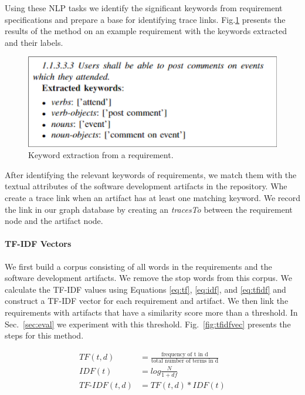   Using these NLP tasks we identify the significant keywords from requirement specifications and prepare a base for identifying trace links. Fig.\ref{fig:keywords} presents the results of the method on an example requirement with the keywords extracted and their labels.

  \begin{figure}[htb]
    \centering
    \includegraphics[width=.96\linewidth]{figs/keywords.png}
    \caption{Keyword extraction from a requirement.}
    \label{fig:keywords}
  \end{figure}

  After identifying the relevant keywords of requirements, we match them with the textual attributes of the software development artifacts in the repository. Whe create a trace link when an artifact has at least one matching keyword. We record the link in our graph database by creating an \emph{tracesTo} between the requirement node and the artifact node.

  \paragraph{TF-IDF Vectors} We first build a corpus consisting of all words in the requirements and the software development artifacts. We remove the stop words from this corpus. We calculate the TF-IDF values using Equations \ref{eq:tf}, \ref{eq:idf}, and \ref{eq:tfidf} and construct a TF-IDF vector for each requirement and artifact. We then link the requirements with artifacts that have a similarity score more than a threshold. In Sec.~\ref{sec:eval} we experiment with this threshold. Fig.~\ref{fig:tfidfvec} presents the steps for this method.

  \begin{align}
    TF(t,d) &= \frac{\text{frequency of t in d}}{\text{total number of terms in d}} \label{eq:tf} \\
    IDF(t) &= log\frac{N}{1+df} \label{eq:idf}\\
    TF\text{-}IDF(t,d) &= TF(t,d)*IDF(t) \label{eq:tfidf}
  \end{align}

